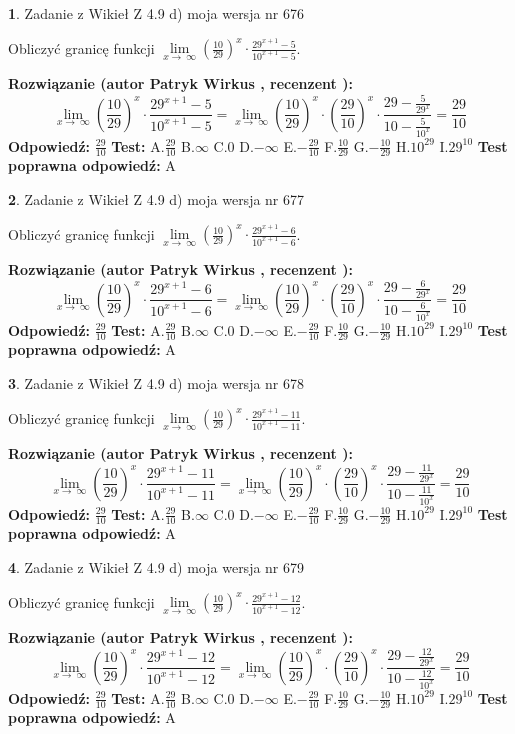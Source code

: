 \documentclass[12pt, a4paper]{article}
\theoremstyle{definition} %
\newtheorem{zad}{}
\newcommand{\zadStart}[1]{\begin{zad}#1\newline}
\newcommand{\zadStop}{\end{zad}}
\newcommand{\rozwStart}[2]{\noindent \textbf{Rozwiązanie (autor #1 , recenzent #2): }\newline}
\newcommand{\rozwStop}{\newline}
\newcommand{\odpStart}{\noindent \textbf{Odpowiedź:}\newline}
\newcommand{\odpStop}{\newline}
\newcommand{\testStart}{\noindent \textbf{Test:}\newline}
\newcommand{\testStop}{\newline}
\newcommand{\kluczStart}{\noindent \textbf{Test poprawna odpowiedź:}\newline}
\newcommand{\kluczStop}{\newline}
\begin{document}
\zadStart{Zadanie z Wikieł Z 4.9 d) moja wersja nr 676}


Obliczyć granicę funkcji  $\lim\limits_{x\to\ \infty}(\frac{10}{29})^{x}\cdot\frac{29^{x+1}-5}{10^{x+1}-5}$.
\zadStop
\rozwStart{Patryk Wirkus}{}
$$\lim\limits_{x\to\ \infty}(\frac{10}{29})^{x}\cdot\frac{29^{x+1}-5}{10^{x+1}-5}=\lim\limits_{x\to\ \infty}(\frac{10}{29})^{x}\cdot(\frac{29}{10})^{x} \cdot \frac{29-\frac{5}{29^{x}}}{10-\frac{5}{10^{x}}} = \frac{29}{10}$$
\rozwStop
\odpStart
$\frac{29}{10}$
\odpStop
\testStart
A.$\frac{29}{10}$ B.$\infty$ C.$0$ D.$-\infty$ E.$-\frac{29}{10}$
F.$\frac{10}{29}$ G.$-\frac{10}{29}$
H.$10^{29}$
I.$29^{10}$
\testStop
\kluczStart
A
\kluczStop



\zadStart{Zadanie z Wikieł Z 4.9 d) moja wersja nr 677}


Obliczyć granicę funkcji  $\lim\limits_{x\to\ \infty}(\frac{10}{29})^{x}\cdot\frac{29^{x+1}-6}{10^{x+1}-6}$.
\zadStop
\rozwStart{Patryk Wirkus}{}
$$\lim\limits_{x\to\ \infty}(\frac{10}{29})^{x}\cdot\frac{29^{x+1}-6}{10^{x+1}-6}=\lim\limits_{x\to\ \infty}(\frac{10}{29})^{x}\cdot(\frac{29}{10})^{x} \cdot \frac{29-\frac{6}{29^{x}}}{10-\frac{6}{10^{x}}} = \frac{29}{10}$$
\rozwStop
\odpStart
$\frac{29}{10}$
\odpStop
\testStart
A.$\frac{29}{10}$ B.$\infty$ C.$0$ D.$-\infty$ E.$-\frac{29}{10}$
F.$\frac{10}{29}$ G.$-\frac{10}{29}$
H.$10^{29}$
I.$29^{10}$
\testStop
\kluczStart
A
\kluczStop



\zadStart{Zadanie z Wikieł Z 4.9 d) moja wersja nr 678}


Obliczyć granicę funkcji  $\lim\limits_{x\to\ \infty}(\frac{10}{29})^{x}\cdot\frac{29^{x+1}-11}{10^{x+1}-11}$.
\zadStop
\rozwStart{Patryk Wirkus}{}
$$\lim\limits_{x\to\ \infty}(\frac{10}{29})^{x}\cdot\frac{29^{x+1}-11}{10^{x+1}-11}=\lim\limits_{x\to\ \infty}(\frac{10}{29})^{x}\cdot(\frac{29}{10})^{x} \cdot \frac{29-\frac{11}{29^{x}}}{10-\frac{11}{10^{x}}} = \frac{29}{10}$$
\rozwStop
\odpStart
$\frac{29}{10}$
\odpStop
\testStart
A.$\frac{29}{10}$ B.$\infty$ C.$0$ D.$-\infty$ E.$-\frac{29}{10}$
F.$\frac{10}{29}$ G.$-\frac{10}{29}$
H.$10^{29}$
I.$29^{10}$
\testStop
\kluczStart
A
\kluczStop



\zadStart{Zadanie z Wikieł Z 4.9 d) moja wersja nr 679}


Obliczyć granicę funkcji  $\lim\limits_{x\to\ \infty}(\frac{10}{29})^{x}\cdot\frac{29^{x+1}-12}{10^{x+1}-12}$.
\zadStop
\rozwStart{Patryk Wirkus}{}
$$\lim\limits_{x\to\ \infty}(\frac{10}{29})^{x}\cdot\frac{29^{x+1}-12}{10^{x+1}-12}=\lim\limits_{x\to\ \infty}(\frac{10}{29})^{x}\cdot(\frac{29}{10})^{x} \cdot \frac{29-\frac{12}{29^{x}}}{10-\frac{12}{10^{x}}} = \frac{29}{10}$$
\rozwStop
\odpStart
$\frac{29}{10}$
\odpStop
\testStart
A.$\frac{29}{10}$ B.$\infty$ C.$0$ D.$-\infty$ E.$-\frac{29}{10}$
F.$\frac{10}{29}$ G.$-\frac{10}{29}$
H.$10^{29}$
I.$29^{10}$
\testStop
\kluczStart
A
\kluczStop
\end{document}
